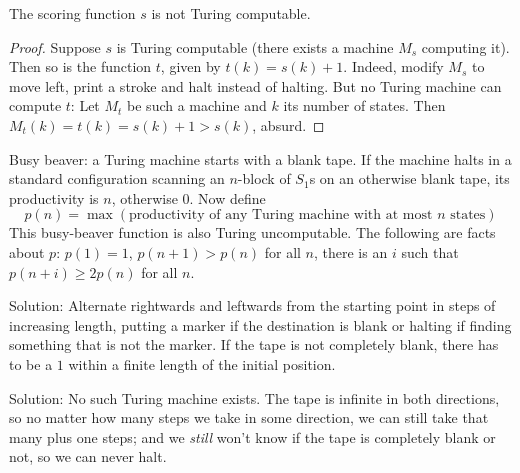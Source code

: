 \begin{theorem}
  The scoring function $s$ is not Turing computable.
\end{theorem}
\begin{proof}
  Suppose $s$ is Turing computable (there exists a machine $M_s$ computing it).
  Then so is the function $t$, given by $t(k) = s(k) + 1$.
  Indeed, modify $M_s$ to move left, print a stroke and halt instead of halting.
  But no Turing machine can compute $t$: Let $M_t$ be such a machine and $k$ its number of states.
  Then $M_t(k) = t(k) = s(k) + 1 > s(k)$, absurd.
\end{proof}

Busy beaver: a Turing machine starts with a blank tape.
If the machine halts in a standard configuration scanning an $n$-block of $S_1$s on an otherwise blank tape, its productivity is $n$, otherwise $0$.
Now define
\begin{equation*}
  p(n) = \max \left(\text{productivity of any Turing machine with at most $n$ states}\right)
\end{equation*}
This busy-beaver function is also Turing uncomputable.
The following are facts about $p$: $p(1) = 1$, $p(n+1)>p(n)$ for all $n$, there is an $i$ such that $p(n+i) \ge 2p(n)$ for all $n$.

\begin{exercise}[4.1]
  Solution: Alternate rightwards and leftwards from the starting point in steps of increasing length, putting a marker if the destination is blank or halting if finding something that is not the marker.
  If the tape is not completely blank, there has to be a $1$ within a finite length of the initial position.
\end{exercise}

\begin{exercise}[4.2]
  Solution: No such Turing machine exists.
  The tape is infinite in both directions, so no matter how many steps we take in some direction, we can still take that many plus one steps; and we \emph{still} won't know if the tape is completely blank or not, so we can never halt.
\end{exercise}

